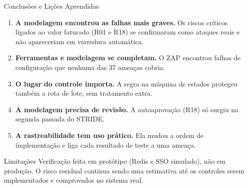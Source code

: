 \documentclass{beamer}
\begin{document}
\begin{frame}{Conclusões e Lições Aprendidas}
    \small
    \begin{enumerate}
        \item \textbf{A modelagem encontrou as falhas mais graves.} Os riscos críticos ligados ao valor faturado (R01 e R18) se confirmaram como ataques reais e não apareceriam em varredura automática.
        \item \textbf{Ferramentas e modelagem se completam.} O ZAP encontrou falhas de configuração que nenhuma das 37 ameaças cobria.
        \item \textbf{O lugar do controle importa.} A regra na máquina de estados protegeu também a rota de lote, sem tratamento extra.
        \item \textbf{A modelagem precisa de revisão.} A autoaprovação (R18) só surgiu na segunda passada do STRIDE.
        \item \textbf{A rastreabilidade tem uso prático.} Ela mudou a ordem de implementação e liga cada resultado de teste a uma ameaça.
    \end{enumerate}

    \vspace{0.15cm}
    \begin{alertblock}{Limitações}
        \scriptsize
        Verificação feita em protótipo (Redis e SSO simulado), não em produção. O risco residual continua sendo uma estimativa até os controles serem implementados e comprovados no sistema real.
    \end{alertblock}
\end{frame}
\end{document}
